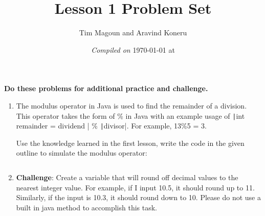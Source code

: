 \documentclass[11pt,fleqn]{article}
\newcommand{\mil}[2][java]{\texttt|#2|}
\begin{document}
\title{Lesson 1 Problem Set}%
\author{Tim Magoun and Aravind Koneru}
\date{\textit{Compiled on} \today \hspace{1mm} at \currenttime}
\maketitle

\begin{center}
\textbf{Do these problems for additional practice and challenge.}
\end{center}

\begin{enumerate}
\item 
The modulus operator in Java is used to find the remainder of a division. This operator takes the
form of \% in Java with an example usage of \mil{int remainder = dividend } \% \mil{divisor}. For example,
13\%5 = 3. 

Use the knowledge learned in the first lesson, write the code in the given outline to simulate the modulus operator:
\inputminted{java}{../../src/ps_1/Modulus.java}

\item
\textbf{Challenge}:
Create a variable that will round off decimal values to the nearest integer value. For example, if I input
10.5, it should round up to 11. Similarly, if the input is 10.3, it should round down to 10. Please do
not use a built in java method to accomplish this task. 

\inputminted{java}{../../src/ps_1/Rounder.java}

\end{enumerate}
\end{document}
